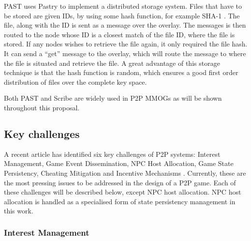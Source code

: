 \documentclass[journal,oneside,a4paper,onecolumn]{IEEEtran}
\begin{document}
PAST \cite{past_storage_focus} uses Pastry to implement a distributed storage system. Files that have to be stored are given IDs, by using some hash function, for example SHA-1 \cite{SHA}. The file, along with the ID is sent as a message over the overlay. The messages is then routed to the node whose ID is a closest match of the file ID, where the file is stored. If any nodes wishes to retrieve the file again, it only required the file hash. It can send a ``get'' message to the overlay, which will route the message to where the file is situated and retrieve the file. A great advantage of this storage technique is that the hash function is random, which ensures a good first order distribution of files over the complete key space.

Both PAST and Scribe are widely used in P2P MMOGs as will be shown throughout this proposal.

\subsection{Key challenges}
\label{key_challenges}

A recent article has identified six key challenges of P2P systems: Interest Management, Game Event Dissemination, NPC Host Allocation, Game State Persistency, Cheating Mitigation and Incentive Mechanisms \cite{Fan_deisgn_issues_p2p}. Currently, these are the most pressing issues to be addressed in the design of a P2P game. Each of these challenges will be described below, except NPC host allocation. NPC host allocation is handled as a specialised form of state persistency management in this work.



\subsubsection{Interest Management}
\label{key_challenges_im}
\end{document}
